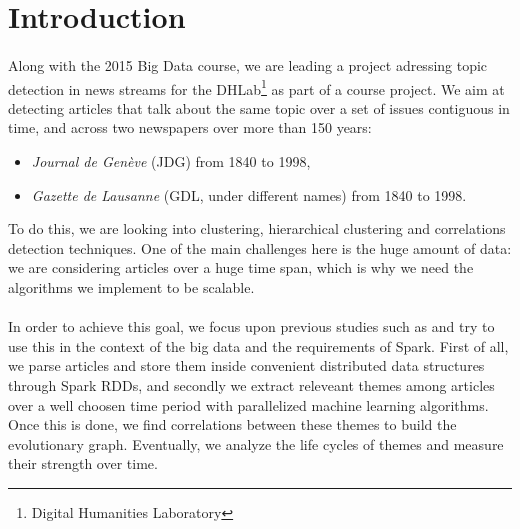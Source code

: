 \section{Introduction}
\paragraph{}
Along with the 2015 Big Data course, we are leading a project adressing topic detection in news streams for the DHLab\footnote{Digital Humanities Laboratory} as part of a course project. We aim at detecting articles that talk about the same topic over a set of issues contiguous in time, and across two newspapers over more than 150 years:
\begin{itemize}
\item \emph{Journal de Genève} (JDG) from 1840 to 1998,
\item \emph{Gazette de Lausanne} (GDL, under different names) from 1840 to 1998.
\end{itemize}
To do this, we are looking into clustering, hierarchical clustering and correlations detection techniques. One of the main challenges here is the huge amount of data: we are considering articles over a huge time span, which is why we need the algorithms we implement to be scalable.

\paragraph{}
In order to achieve this goal, we focus upon previous studies such as \cite{kdd05-ttm} and try to use this in the context of the big data and the requirements of Spark.
First of all, we parse articles and store them inside convenient distributed data structures through Spark RDDs, and secondly we extract releveant themes among articles over a well choosen time period with parallelized machine learning algorithms. Once this is done, we find correlations between these themes to build the evolutionary graph. Eventually, we analyze the life cycles of themes and measure their strength over time.
